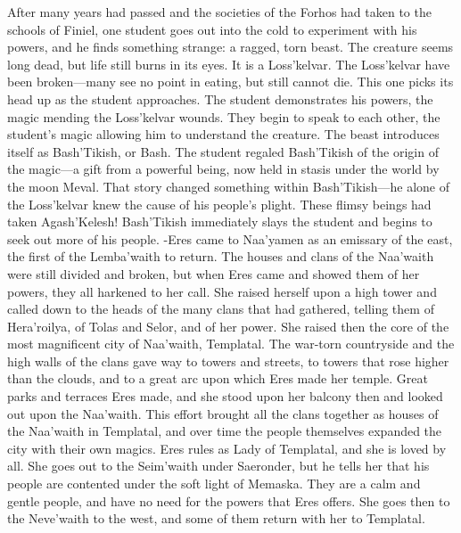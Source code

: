 \documentclass[smalldemyvopaper,11pt,twoside,onecolumn,openright,extrafontsizes]{memoir}
\begin{document}
{{After many years had passed and the societies of the Forhos had taken to the schools of Finiel, one student goes out into the cold to experiment with his powers, and he finds something strange: a ragged, torn beast. The creature seems long dead, but life still burns in its eyes. It is a Loss’kelvar. The Loss’kelvar have been broken—many see no point in eating, but still cannot die. This one picks its head up as the student approaches. The student demonstrates his powers, the magic mending the Loss’kelvar wounds. They begin to speak to each other, the student’s magic allowing him to understand the creature. The beast introduces itself as Bash'Tikish, or Bash. The student regaled Bash’Tikish of the origin of the magic—a gift from a powerful being, now held in stasis under the world by the moon Meval. That story changed something within Bash’Tikish—he alone of the Loss’kelvar knew the cause of his people’s plight. These flimsy beings had taken Agash’Kelesh! Bash’Tikish immediately slays the student and begins to seek out more of his people.
-Eres came to Naa’yamen as an emissary of the east, the first of the Lemba’waith to return. The houses and clans of the Naa’waith were still divided and broken, but when Eres came and showed them of her powers, they all harkened to her call. She raised herself upon a high tower and called down to the heads of the many clans that had gathered, telling them of Hera’roilya, of Tolas and Selor, and of her power. She raised then the core of the most magnificent city of Naa’waith, Templatal. The war-torn countryside and the high walls of the clans gave way to towers and streets, to towers that rose higher than the clouds, and to a great arc upon which Eres made her temple. Great parks and terraces Eres made, and she stood upon her balcony then and looked out upon the Naa’waith. This effort brought all the clans together as houses of the Naa’waith in Templatal, and over time the people themselves expanded the city with their own magics. Eres rules as Lady of Templatal, and she is loved by all. She goes out to the Seim’waith under Saeronder, but he tells her that his people are contented under the soft light of Memaska. They are a calm and gentle people, and have no need for the powers that Eres offers. She goes then to the Neve’waith to the west, and some of them return with her to Templatal.

}}
\end{document}
